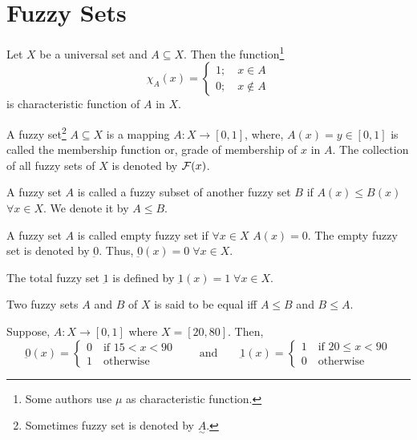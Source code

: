 \documentclass[../main-sheet.tex]{subfiles}
\begin{document}
\chapter{Fuzzy Sets}
\begin{defn}
    Let \(X\) be a universal set and \(A\subseteq X\). Then the function\footnote{Some authors use \(\mu\) as characteristic function.}
    \[\chi_A(x)=\begin{cases}
        1;\quad x\in A\\
        0;\quad x\notin A
    \end{cases}\]
    is characteristic function of \(A\) in \(X\).
\end{defn}


\begin{defn}
    A fuzzy set\footnote{Sometimes fuzzy set is denoted by \(\underset{\sim}{A}\).} \(A\subseteq X\) is a mapping \(A:X\to[0,1]\), where, \(A(x)=y\in [0,1]\) is called the membership function or, grade of membership of \(x\) in \(A\). The collection of all fuzzy sets of \(X\) is denoted by \(\mathcal{F}(x)\).
\end{defn}
\begin{defn}
    A fuzzy set \(A\) is called a fuzzy subset of another fuzzy set \(B\) if \(A(x)\leq B(x)\) \(\forall x\in X\). We denote it by \(A\leq B\).
\end{defn}
\begin{defn}
    A fuzzy set \(A \) is called empty fuzzy set if \(\forall x\in X\) \(A(x)=0\). The empty fuzzy set is denoted by \(\underbar{0}\). Thus, \(\underbar{0}(x)=0\; \forall x\in  X\).
\end{defn}
\begin{defn} The total fuzzy set \(\underbar{1}\) is defined by  \(\underbar{1}(x)=1\; \forall x\in  X\).
\end{defn}
\begin{defn}
    Two fuzzy sets \(A\) and \(B\) of \(X\) is said to be equal iff \(A\leq B\) and \(B\leq A\).
\end{defn}
\begin{ex}
    Suppose, \(A:X\to[0,1]\) where \(X=[20,80]\). Then,
    \[
        \underbar{0}(x)=\begin{cases}
        0\quad \text{if } 15<x<90\\
        1\quad \text{otherwise }
    \end{cases}\qquad\text{and}\qquad
        \underbar{1}(x)=\begin{cases}
        1\quad \text{if } 20\leq x<90\\
        0\quad \text{otherwise }
    \end{cases}
    \]
\end{ex}
\end{document}
